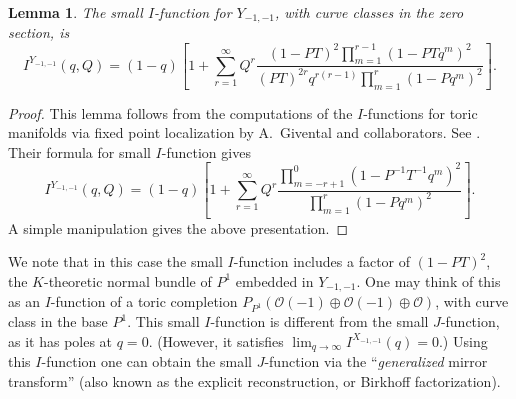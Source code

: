 \documentclass[11pt]{amsart}
\newtheorem{lemma}[theorem]{Lemma}
\newtheorem*{main theorem*}{Main Theorem}
\theoremstyle{remark}
\numberwithin{equation}{section}
\def\O{\mathcal{O}}
\begin{document}
\begin{lemma} \label{l:4.5} 
The small $I$-function for %
$Y_{-1,-1}$, with curve classes in the zero section, is
\[
  I^{Y_{-1,-1}}(q, Q) = (1-q) \left[ 1+ \sum_{r=1}^{\infty} Q^r \frac{(1-PT)^2 \prod_{m=1}^{r-1}(1-PT q^m)^2}
  {(PT)^{2r}q^{r(r-1)} \prod_{m=1}^r (1-Pq^m)^2} \right].
\]
\end{lemma}

\begin{proof}
This lemma follows from the computations of the $I$-functions for toric manifolds via fixed point localization by A.~Givental and collaborators. See \cite{Givental_Tonita_2011, Givental_PEV_Toric_2015}. Their formula for small $I$-function gives
\[
  I^{Y_{-1,-1}}(q, Q) = (1-q) \left[ 1+ \sum_{r=1}^{\infty} Q^r \frac{\prod_{m={-r+1}}^{0}(1-P^{-1} T^{-1} q^m)^2}
  {\prod_{m=1}^r (1-Pq^m)^2} \right].
\]
A simple manipulation gives the above presentation.
\end{proof}


We note that in this case the small $I$-function includes a factor of $(1-PT)^2$, the $K$-theoretic normal bundle of $P^1$ embedded in $Y_{-1,-1}$. One may think of this as an $I$-function of a toric completion $P_{P^1} (\O(-1) \oplus \O (-1) \oplus \O)$, with curve class in the base $P^1$. 
This small $I$-function is different from the small $J$-function, as it has poles at $q=0$. 
(However, it satisfies $\lim_{q \to \infty} I^{X_{-1,-1}}(q) =0$.) Using this $I$-function one can obtain the small $J$-function via the ``\emph{generalized} mirror transform'' (also known as the explicit reconstruction, or Birkhoff factorization).
\end{document}
